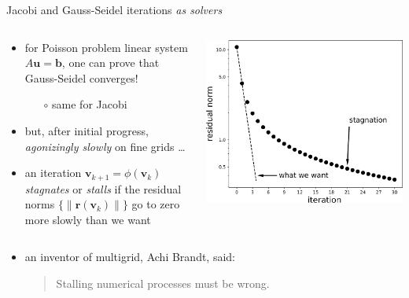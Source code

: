 \documentclass[10pt,
               svgnames,
               hyperref={colorlinks,citecolor=DeepPink4,linkcolor=FireBrick,urlcolor=Maroon},
               usepdftitle=false]{beamer}
\newcommand{\bb}{\mathbf{b}}
\newcommand{\br}{\mathbf{r}}
\newcommand{\bu}{\mathbf{u}}
\newcommand{\bv}{\mathbf{v}}
\begin{document}
\begin{frame}{Jacobi and Gauss-Seidel iterations \emph{as solvers}}

\begin{columns}
\begin{column}{0.5\textwidth}
\begin{itemize}
\item for Poisson problem linear system $A\bu=\bb$, one can prove that Gauss-Seidel converges!
    \begin{itemize}
    \item[$\circ$] same for Jacobi
    \end{itemize}
\item but, after initial progress, \emph{agonizingly slowly} on fine grids \dots
\item an iteration $\bv_{k+1} = \phi(\bv_k)$ \emph{stagnates} or \emph{stalls} if the residual norms $\{\|\br(\bv_k)\|\}$ go to zero more slowly than we want
\end{itemize}
\end{column}
\begin{column}{0.5\textwidth}
\includegraphics[width=\textwidth]{images/stagnation.png}
\end{column}
\end{columns}

\bigskip
\begin{itemize}
\item an inventor of multigrid, Achi Brandt, said:
\begin{quotation}
Stalling numerical processes must be wrong.


\end{quotation}
\end{itemize}
\end{frame}
\end{document}
